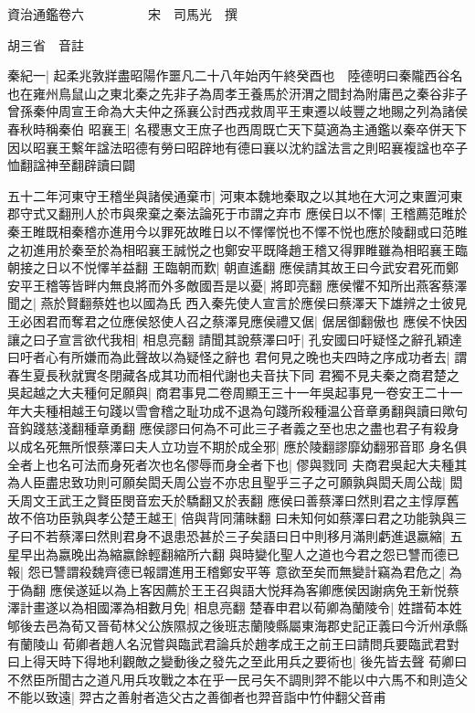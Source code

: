 資治通鑑卷六　　　　　宋　司馬光　撰

胡三省　音註

秦紀一|{
	起柔兆敦牂盡昭陽作噩凡二十八年始丙午終癸酉也　陸德明曰秦隴西谷名也在雍州鳥鼠山之東北秦之先非子為周孝王養馬於汧渭之間封為附庸邑之秦谷非子曾孫秦仲周宣王命為大夫仲之孫襄公討西戎救周平王東遷以岐豐之地賜之列為諸侯春秋時稱秦伯}
昭襄王|{
	名稷惠文王庶子也西周既亡天下莫適為主通鑑以秦卒併天下因以昭襄王繫年諡法昭德有勞曰昭辟地有德曰襄以沈約諡法言之則昭襄複諡也卒子恤翻諡神至翻辟讀曰闢}


五十二年河東守王稽坐與諸侯通棄市|{
	河東本魏地秦取之以其地在大河之東置河東郡守式又翻刑人於市與衆棄之秦法論死于市謂之弃市}
應侯日以不懌|{
	王稽薦范睢於秦王睢既相秦稽亦進用今以罪死故睢日以不懌懌悦也不懌不悦也應於陵翻或曰范睢之初進用於秦至於為相昭襄王誠悦之也鄭安平既降趙王稽又得罪睢雖為相昭襄王臨朝接之日以不悦懌羊益翻}
王臨朝而歎|{
	朝直遙翻}
應侯請其故王曰今武安君死而鄭安平王稽等皆畔内無良將而外多敵國吾是以憂|{
	將即亮翻}
應侯懼不知所出燕客蔡澤聞之|{
	燕於賢翻蔡姓也以國為氏}
西入秦先使人宣言於應侯曰蔡澤天下雄辨之士彼見王必困君而奪君之位應侯怒使人召之蔡澤見應侯禮又倨|{
	倨居御翻傲也}
應侯不快因讓之曰子宣言欲代我相|{
	相息亮翻}
請聞其說蔡澤曰吁|{
	孔安國曰吁疑怪之辭孔穎達曰吁者心有所嫌而為此聲故以為疑怪之辭也}
君何見之晚也夫四時之序成功者去|{
	謂春生夏長秋就實冬閉藏各成其功而相代謝也夫音扶下同}
君獨不見夫秦之商君楚之吳起越之大夫種何足願與|{
	商君事見二卷周顯王三十一年吳起事見一卷安王二十一年大夫種相越王句踐以雪會稽之耻功成不退為句踐所殺種温公音章勇翻與讀曰歟句音鈎踐慈淺翻種章勇翻}
應侯謬曰何為不可此三子者義之至也忠之盡也君子有殺身以成名死無所恨蔡澤曰夫人立功豈不期於成全邪|{
	應於陵翻謬靡幼翻邪音耶}
身名俱全者上也名可法而身死者次也名僇辱而身全者下也|{
	僇與戮同}
夫商君吳起大夫種其為人臣盡忠致功則可願矣閎夭周公豈不亦忠且聖乎三子之可願孰與閎夭周公哉|{
	閎夭周文王武王之賢臣閔音宏夭於驕翻又於表翻}
應侯曰善蔡澤曰然則君之主惇厚舊故不倍功臣孰與孝公楚王越王|{
	倍與背同蒲昧翻}
曰未知何如蔡澤曰君之功能孰與三子曰不若蔡澤曰然則君身不退患恐甚於三子矣語曰日中則移月滿則虧進退嬴縮|{
	五星早出為嬴晚出為縮嬴餘輕翻縮所六翻}
與時變化聖人之道也今君之怨已讐而德已報|{
	怨已讐謂殺魏齊德已報謂進用王稽鄭安平等}
意欲至矣而無變計竊為君危之|{
	為于偽翻}
應侯遂延以為上客因薦於王王召與語大悦拜為客卿應侯因謝病免王新悦蔡澤計畫遂以為相國澤為相數月免|{
	相息亮翻}
楚春申君以荀卿為蘭陵令|{
	姓譜荀本姓郇後去邑為荀又晉荀林父公族隰叔之後班志蘭陵縣屬東海郡史記正義曰今沂州承縣有蘭陵山}
荀卿者趙人名況嘗與臨武君論兵於趙孝成王之前王曰請問兵要臨武君對曰上得天時下得地利觀敵之變動後之發先之至此用兵之要術也|{
	後先皆去聲}
荀卿曰不然臣所聞古之道凡用兵攻戰之本在乎一民弓矢不調則羿不能以中六馬不和則造父不能以致遠|{
	羿古之善射者造父古之善御者也羿音詣中竹仲翻父音甫}

